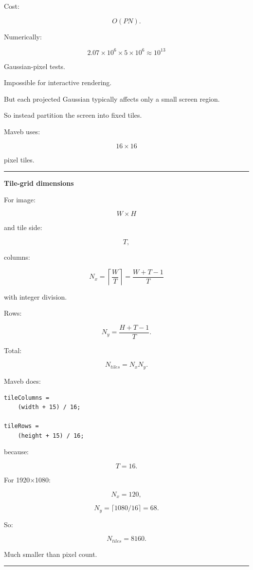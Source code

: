 Cost:

\[
O(PN).
\]

Numerically:

\[
2.07\times10^6
\times
5\times10^6
\approx
10^{13}
\]

Gaussian-pixel tests.

Impossible for interactive rendering.

But each projected Gaussian typically affects only a small screen region.

So instead partition the screen into fixed tiles.

Maveb uses:

\[
\boxed{16\times16}
\]

pixel tiles.

\begin{center}\rule{0.5\linewidth}{0.5pt}\end{center}

\textbf{Tile-grid dimensions}

For image:

\[
W\times H
\]

and tile side:

\[
T,
\]

columns:

\[
\boxed{
N_x
=
\left\lceil
\frac WT
\right\rceil
=
\frac{W+T-1}{T}
}
\]

with integer division.

Rows:

\[
\boxed{
N_y
=
\frac{H+T-1}{T}.
}
\]

Total:

\[
N_{tiles}=N_xN_y.
\]

Maveb does:

\begin{verbatim}
tileColumns =
    (width + 15) / 16;

tileRows =
    (height + 15) / 16;
\end{verbatim}

because:

\[
T=16.
\]

For 1920×1080:

\[
N_x=120,
\]

\[
N_y=
\lceil1080/16\rceil
=
68.
\]

So:

\[
N_{tiles}=8160.
\]

Much smaller than pixel count.

\begin{center}\rule{0.5\linewidth}{0.5pt}\end{center}


